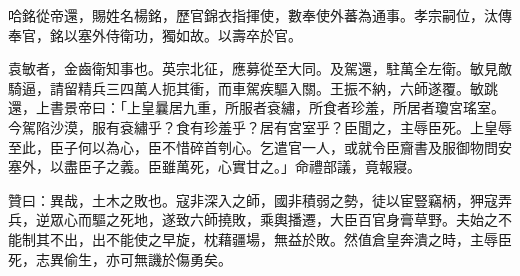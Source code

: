 \begin{pinyinscope}
哈銘從帝還，賜姓名楊銘，歷官錦衣指揮使，數奉使外蕃為通事。孝宗嗣位，汰傳奉官，銘以塞外侍衛功，獨如故。以壽卒於官。

袁敏者，金齒衛知事也。英宗北征，應募從至大同。及駕還，駐萬全左衛。敏見敵騎逼，請留精兵三四萬人扼其衝，而車駕疾驅入關。王振不納，六師遂覆。敏跳還，上書景帝曰：「上皇曩居九重，所服者袞繡，所食者珍羞，所居者瓊宮瑤室。今駕陷沙漠，服有袞繡乎？食有珍羞乎？居有宮室乎？臣聞之，主辱臣死。上皇辱至此，臣子何以為心，臣不惜碎首刳心。乞遣官一人，或就令臣齎書及服御物問安塞外，以盡臣子之義。臣雖萬死，心實甘之。」命禮部議，竟報寢。

贊曰：異哉，土木之敗也。寇非深入之師，國非積弱之勢，徒以宦豎竊柄，狎寇弄兵，逆眾心而驅之死地，遂致六師撓敗，乘輿播遷，大臣百官身膏草野。夫始之不能制其不出，出不能使之早旋，枕藉疆場，無益於敗。然值倉皇奔潰之時，主辱臣死，志異偷生，亦可無譏於傷勇矣。


\end{pinyinscope}